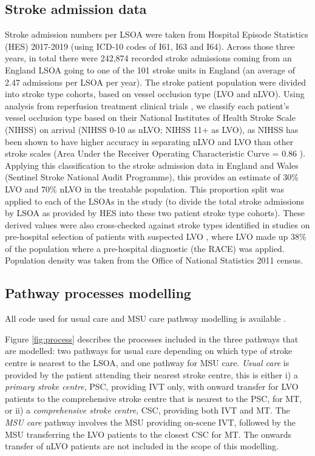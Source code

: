 \subsection{Stroke admission data}

Stroke admission numbers per LSOA were taken from Hospital Episode Statistics (HES) 2017-2019 (using ICD-10 codes of I61, I63 and I64). Across those three years, in total there were 242,874 recorded stroke admissions coming from an England LSOA going to one of the 101 stroke units in England (an average of 2.47 admissions per LSOA per year). The stroke patient population were divided into stroke type cohorts, based on vessel occlusion type (LVO and nLVO). Using analysis from reperfusion treatment clinical trials \cite{lees_time_2010, emberson_effect_2014, goyal_endovascular_2016, fransen_time_2016}, we classify each patient's vessel occlusion type based on their National Institutes of Health Stroke Scale (NIHSS) on arrival (NIHSS 0-10 as nLVO; NIHSS 11+ as LVO), as NIHSS has been shown to have higher accuracy in separating nLVO and LVO than other stroke scales (Area Under the Receiver Operating Characteristic Curve = 0.86 \cite{duvekot_comparison_2021}). Applying this classification to the stroke admission data in England and Wales (Sentinel Stroke National Audit Programme), this provides an estimate of 30\% LVO and 70\% nLVO in the treatable population. This proportion split was applied to each of the LSOAs in the study (to divide the total stroke admissions by LSOA as provided by HES into these two patient stroke type cohorts). These derived values were also cross-checked against stroke types identified in studies on pre-hospital selection of patients with suspected LVO \cite{de_la_ossa_herrero_design_2013}, where LVO made up 38\% of the population where a pre-hospital diagnostic (the RACE) was applied. Population density was taken from the Office of National Statistics 2011 census.

\subsection{Pathway processes modelling}

All code used for usual care and MSU care pathway modelling is available \cite{github1}.

Figure \ref{fig:process} describes the processes included in the three pathways that are modelled: two pathways for usual care depending on which type of stroke centre is nearest to the LSOA, and one pathway for MSU care. \textit{Usual care} is provided by the patient attending their nearest stroke centre, this is either i) a \textit{primary stroke centre}, PSC, providing IVT only, with onward transfer for LVO patients to the comprehensive stroke centre that is nearest to the PSC, for MT, or ii) a \textit{comprehensive stroke centre}, CSC, providing both IVT and MT. The \textit{MSU care} pathway involves the MSU providing on-scene IVT, followed by the MSU transferring the LVO patients to the closest CSC for MT. The onwards transfer of nLVO patients are not included in the scope of this modelling.

